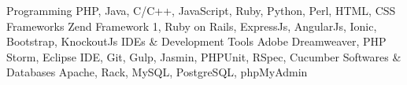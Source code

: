 \begin{cvskills}
  \cvskill
    {Programming}
    {PHP, Java, C/C++, JavaScript, Ruby, Python, Perl, HTML, CSS}
  \cvskill
  {Frameworks}
  {Zend Framework 1, Ruby on Rails, ExpressJs, AngularJs, Ionic, Bootstrap, KnockoutJs}  
  \cvskill
  {IDEs \& Development Tools}
  {Adobe Dreamweaver, PHP Storm, Eclipse IDE, Git, Gulp, Jasmin, PHPUnit, RSpec, Cucumber}  
  \cvskill
  {Softwares \& Databases}
  {Apache, Rack, MySQL, PostgreSQL, phpMyAdmin}      
    
\end{cvskills}
